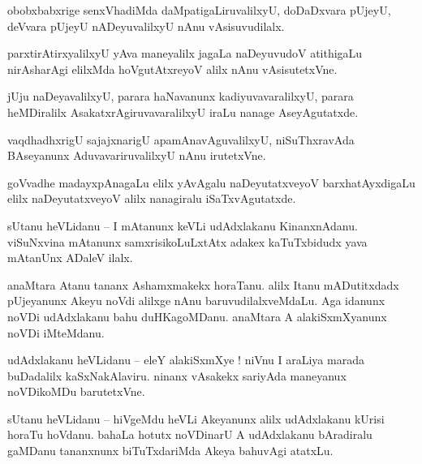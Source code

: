 \documentclass{article}
\begin{document}
\begin{mn}%
obobxbabxrige senxVhadiMda daMpatigaLiruvalilxyU, doDaDxvara pUjeyU, deVvara pUjeyU nADeyuvalilxyU 
nAnu vAsisuvudilalx.
\end{mn}

\begin{mn}%
parxtirAtirxyalilxyU yAva maneyalilx jagaLa naDeyuvudoV atithigaLu nirAsharAgi elilxMda 
hoVgutAtxreyoV alilx nAnu vAsisutetxVne.
\end{mn}

\begin{mn}%
jUju naDeyavalilxyU, parara haNavanunx kadiyuvavaralilxyU, parara heMDiralilx 
AsakatxrAgiruvavaralilxyU iraLu nanage AseyAgutatxde.
\end{mn}

\begin{mn}%
vaqdhadhxrigU sajajxnarigU apamAnavAguvalilxyU, niSuThxravAda BAseyanunx AduvavariruvalilxyU nAnu 
irutetxVne.
\end{mn}

\begin{mn}%
goVvadhe madayxpAnagaLu elilx yAvAgalu naDeyutatxveyoV barxhatAyxdigaLu elilx naDeyutatxveyoV 
alilx nanagiralu iSaTxvAgutatxde.
\end{mn}

\begin{mn}%
sUtanu heVLidanu -- I mAtanunx keVLi udAdxlakanu KinanxnAdanu. viSuNxvina mAtanunx 
samxrisikoLuLxtAtx adakex kaTuTxbidudx yava mAtanUnx ADaleV ilalx.
\end{mn}

\begin{mn}%
anaMtara Atanu tananx Ashamxmakekx horaTanu. alilx Itanu mADutitxdadx pUjeyanunx Akeyu noVdi 
alilxge nAnu baruvudilalxveMdaLu. Aga idanunx noVDi udAdxlakanu bahu duHKagoMDanu. anaMtara A  
alakiSxmXyanunx noVDi iMteMdanu.
\end{mn}

\begin{mn}%
udAdxlakanu heVLidanu -- eleY alakiSxmXye ! niVnu I araLiya marada buDadalilx kaSxNakAlaviru. 
ninanx vAsakekx sariyAda maneyanux noVDikoMDu barutetxVne.
\end{mn}

\begin{mn}%
sUtanu heVLidanu -- hiVgeMdu heVLi Akeyanunx alilx udAdxlakanu kUrisi horaTu hoVdanu. bahaLa 
hotutx noVDinarU A udAdxlakanu bAradiralu gaMDanu tananxnunx biTuTxdariMda Akeya bahuvAgi atatxLu.
\end{mn}
\end{document}
